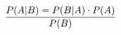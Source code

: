 \documentclass[preview]{standalone}
\begin{document}
\begin{align*}
P(A|B) = P(B|A) \cdot P(A) \over P(B)
\end{align*}
\end{document}
